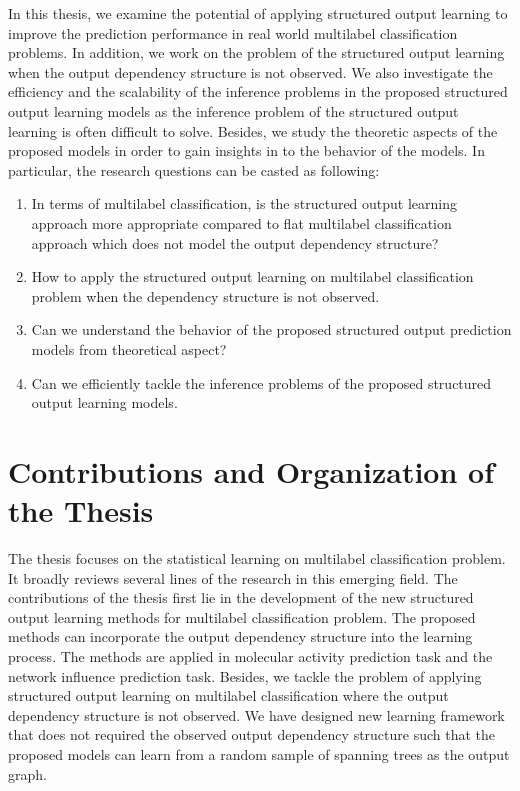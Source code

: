 In this thesis, we examine the potential of applying structured output learning to improve the prediction performance in real world multilabel classification problems.
In addition, we work on the problem of the structured output learning when the output dependency structure is not observed.
We also investigate the efficiency and the scalability of the inference problems in the proposed structured output learning models as the inference problem of the structured output learning is often difficult to solve.
Besides, we study the theoretic aspects of the proposed models in order to gain insights in to the behavior of the models.
In particular, the research questions can be casted as following:
\begin{enumerate}[label=\textbf{Q \Roman*}:]
	
\item In terms of multilabel classification, is the structured output learning approach more appropriate compared to flat multilabel classification approach which does not model the output dependency structure?

\item How to apply the structured output learning on multilabel classification problem when the dependency structure is not observed.

\item Can we understand the behavior of the proposed structured output prediction models from theoretical aspect? 

\item Can we efficiently tackle the inference problems of the proposed structured output learning models.

\end{enumerate}



%
%
\section{Contributions and Organization of the Thesis}

The thesis focuses on the statistical learning on multilabel classification problem.
It broadly reviews several lines of the research in this emerging field.
The contributions of the thesis first lie in the development of the new structured output learning methods for multilabel classification problem.
The proposed methods can incorporate the output dependency structure into the learning process.
The methods are applied in molecular activity prediction task and the network influence prediction task.
Besides, we tackle the problem of applying structured output learning on multilabel classification where the output dependency structure is not observed.
We have designed new learning framework that does not required the observed output dependency structure such that the proposed models can learn from a random sample of spanning trees as the output graph.

